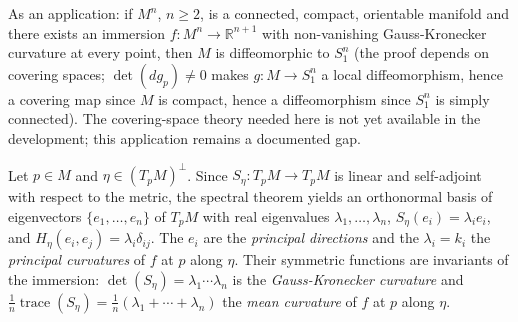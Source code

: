 \begin{remark}
  \label{rem:dc-ch6-2-4-covering}
  \notready
  As an application: if $M^n$, $n\geq 2$, is a connected, compact,
  orientable manifold and there exists an immersion $f:M^n\to\mathbb{R}^{n+1}$ with
  non-vanishing Gauss-Kronecker curvature at every point, then $M$ is diffeomorphic
  to $S_1^n$ (the proof depends on covering spaces; $\det(dg_p)\neq 0$ makes
  $g:M\to S_1^n$ a local diffeomorphism, hence a covering map since $M$ is compact,
  hence a diffeomorphism since $S_1^n$ is simply connected). The covering-space
  theory needed here is not yet available in the development; this application
  remains a documented gap.
\end{remark}

\begin{definition}
  \label{def:dc-ch6-2-4-principal}
  \leanok
  Let $p\in M$ and $\eta\in(T_pM)^\perp$. Since $S_\eta:T_pM\to T_pM$ is linear
  and self-adjoint with respect to the metric, the spectral theorem yields an
  orthonormal basis of eigenvectors $\{e_1,\dots,e_n\}$ of $T_pM$ with real
  eigenvalues $\lambda_1,\dots,\lambda_n$, $S_\eta(e_i)=\lambda_ie_i$, and
  $H_\eta(e_i,e_j)=\lambda_i\delta_{ij}$. The $e_i$ are the \emph{principal
  directions} and the $\lambda_i=k_i$ the \emph{principal curvatures} of $f$ at
  $p$ along $\eta$. Their symmetric functions are invariants of the immersion:
  $\det(S_\eta)=\lambda_1\cdots\lambda_n$ is the \emph{Gauss-Kronecker
  curvature} and $\frac1n\operatorname{trace}(S_\eta)
  =\frac1n(\lambda_1+\cdots+\lambda_n)$ the \emph{mean curvature} of $f$ at $p$
  along $\eta$.
\end{definition}

